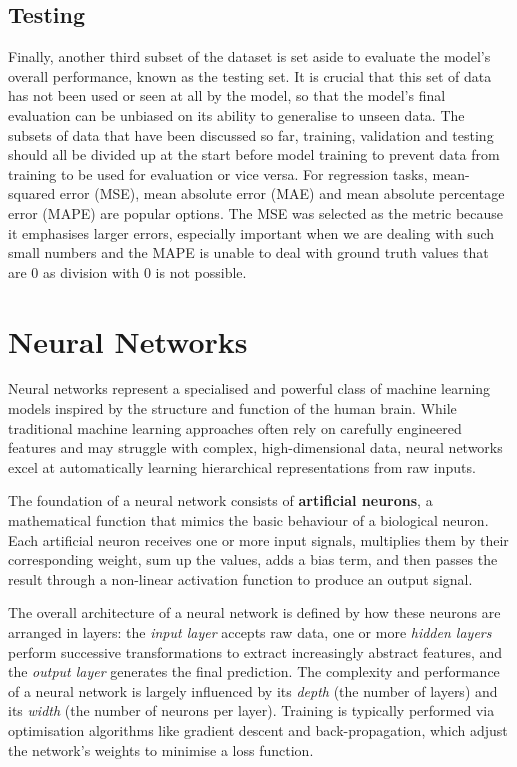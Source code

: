 \subsection{Testing}
Finally, another third subset of the dataset is set aside to evaluate the model's overall performance, known as the testing set. It is crucial that this set of data has not been used or seen at all by the model, so that the model's final evaluation can be unbiased on its ability to generalise to unseen data. The subsets of data that have been discussed so far, training, validation and testing should all be divided up at the start before model training to prevent data from training to be used for evaluation or vice versa. For regression tasks, mean-squared error (MSE), mean absolute error (MAE) and mean absolute percentage error (MAPE) are popular options. The MSE was selected as the metric because it emphasises larger errors, especially important when we are dealing with such small numbers and the MAPE is unable to deal with ground truth values that are 0 as division with 0 is not possible.



\section{Neural Networks}
Neural networks represent a specialised and powerful class of machine learning models inspired by the structure and function of the human brain. While traditional machine learning approaches often rely on carefully engineered features and may struggle with complex, high-dimensional data, neural networks excel at automatically learning hierarchical representations from raw inputs.

The foundation of a neural network consists of \textbf{artificial neurons}, a mathematical function that mimics the basic behaviour of a biological neuron. Each artificial neuron receives one or more input signals, multiplies them by their corresponding weight, sum up the values, adds a bias term, and then passes the result through a non-linear activation function to produce an output signal.


The overall architecture of a neural network is defined by how these neurons are arranged in layers: the \textit{input layer} accepts raw data, one or more \textit{hidden layers} perform successive transformations to extract increasingly abstract features, and the \textit{output layer} generates the final prediction. The complexity and performance of a neural network is largely influenced by its \textit{depth} (the number of layers) and its \textit{width} (the number of neurons per layer). Training is typically performed via optimisation algorithms like gradient descent and back-propagation, which adjust the network’s weights to minimise a loss function.

